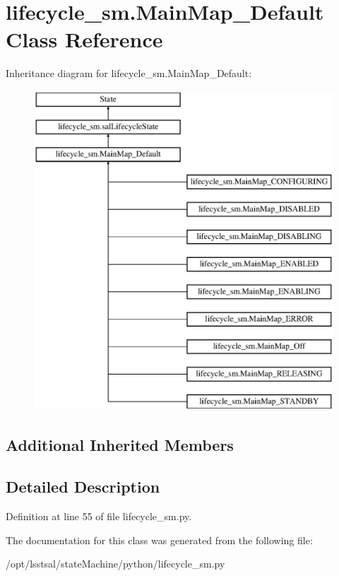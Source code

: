 \hypertarget{classlifecycle__sm_1_1_main_map___default}{\section{lifecycle\-\_\-sm.\-Main\-Map\-\_\-\-Default Class Reference}
\label{classlifecycle__sm_1_1_main_map___default}
}
Inheritance diagram for lifecycle\-\_\-sm.\-Main\-Map\-\_\-\-Default\-:\begin{figure}[H]
\begin{center}
\leavevmode
\includegraphics[height=12.000000cm]{classlifecycle__sm_1_1_main_map___default}
\end{center}
\end{figure}
\subsection*{Additional Inherited Members}


\subsection{Detailed Description}


Definition at line 55 of file lifecycle\-\_\-sm.\-py.



The documentation for this class was generated from the following file\-:\begin{DoxyCompactItemize}
\item 
/opt/lsstsal/state\-Machine/python/lifecycle\-\_\-sm.\-py\end{DoxyCompactItemize}

